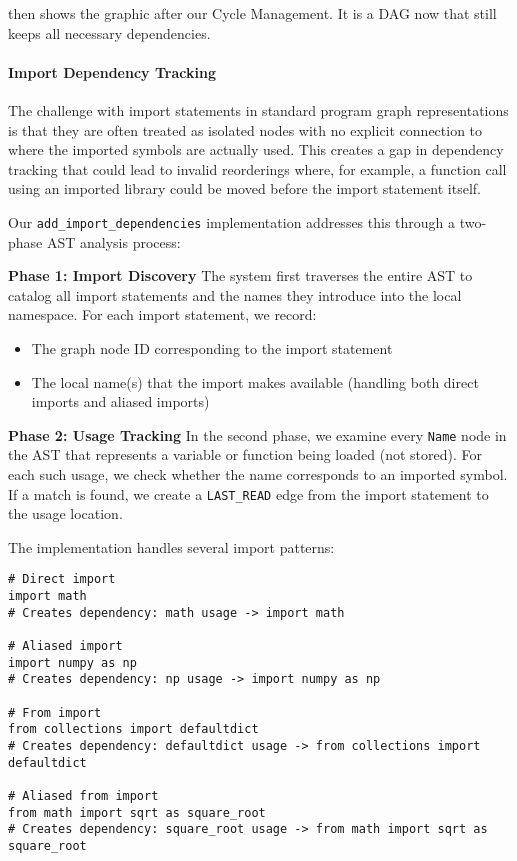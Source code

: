 \documentclass[%
thesis=student,%
coverpage=false,%
titlepage=false,%
headmarks=true, %
english,%
font=libertine, %
math=newpxtx, %
BCOR=5mm,%
coverBCOR=11mm%
]{tum-templates/book/tumbook}
\begin{document}
 then shows the graphic after our Cycle Management. It is a DAG now that still keeps all necessary dependencies.


\paragraph{Import Dependency Tracking}

The challenge with import statements in standard program graph representations is that they are often treated as isolated nodes with no explicit connection to where the imported symbols are actually used. This creates a gap in dependency tracking that could lead to invalid reorderings where, for example, a function call using an imported library could be moved before the import statement itself.

Our \texttt{add\_import\_dependencies} implementation addresses this through a two-phase AST analysis process:

\textbf{Phase 1: Import Discovery}
The system first traverses the entire AST to catalog all import statements and the names they introduce into the local namespace. For each import statement, we record:
\begin{itemize}
    \item The graph node ID corresponding to the import statement
    \item The local name(s) that the import makes available (handling both direct imports and aliased imports)
\end{itemize}

\textbf{Phase 2: Usage Tracking}
In the second phase, we examine every \texttt{Name} node in the AST that represents a variable or function being loaded (not stored). For each such usage, we check whether the name corresponds to an imported symbol. If a match is found, we create a \texttt{LAST\_READ} edge from the import statement to the usage location.

The implementation handles several import patterns:

\begin{lstlisting}[style=pythonstyle, caption={Different import patterns that can occur and that need to be covered as dependencies}]
# Direct import
import math
# Creates dependency: math usage -> import math

# Aliased import  
import numpy as np
# Creates dependency: np usage -> import numpy as np

# From import
from collections import defaultdict
# Creates dependency: defaultdict usage -> from collections import defaultdict

# Aliased from import
from math import sqrt as square_root
# Creates dependency: square_root usage -> from math import sqrt as square_root
\end{lstlisting}
\end{document}
